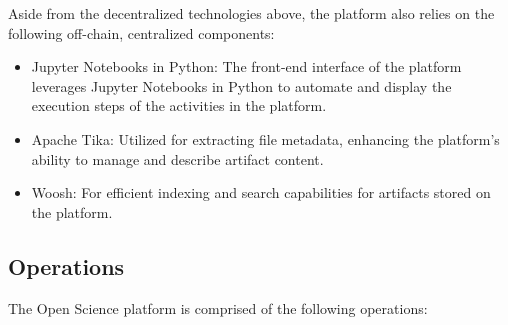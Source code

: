 \documentclass{article}
\begin{document}
Aside from the decentralized technologies above, the platform also relies on the following off-chain, centralized components:

\begin{itemize}
      \item Jupyter Notebooks in Python: The front-end interface of the platform leverages Jupyter Notebooks in Python to automate and display the execution steps of the activities in the platform.
      \item Apache Tika: Utilized for extracting file metadata, enhancing the platform's ability to manage and describe artifact content.
      \item Woosh: For efficient indexing and search capabilities for artifacts stored on the platform.
\end{itemize}

\subsection{Operations}

The Open Science platform is comprised of the following operations:
\end{document}
